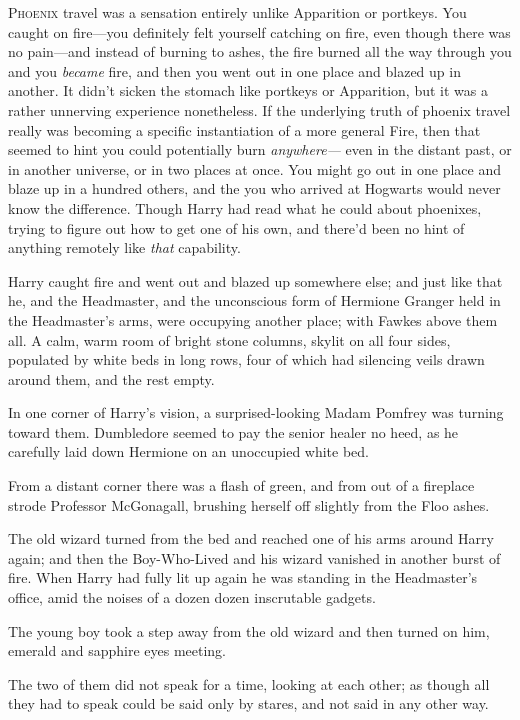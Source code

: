 
\lettrine{P}{hoenix} travel
was a sensation entirely unlike Apparition or portkeys. You caught on
fire---you definitely felt yourself catching on fire, even though there was no
pain---and instead of burning to ashes, the fire burned all the way through you
and you \emph{became} fire, and then you went out in one place and blazed up in
another. It didn't sicken the stomach like portkeys or Apparition, but it was a
rather unnerving experience nonetheless. If the underlying truth of phoenix
travel really was becoming a specific instantiation of a more general Fire,
then that seemed to hint you could potentially burn \emph{anywhere---} even in
the distant past, or in another universe, or in two places at once. You might
go out in one place and blaze up in a hundred others, and the you who arrived
at Hogwarts would never know the difference. Though Harry had read what he
could about phoenixes, trying to figure out how to get one of his own, and
there'd been no hint of anything remotely like \emph{that} capability.

Harry caught fire and went out and blazed up somewhere else; and just like that
he, and the Headmaster, and the unconscious form of Hermione Granger held in
the Headmaster's arms, were occupying another place; with Fawkes above them
all. A calm, warm room of bright stone columns, skylit on all four sides,
populated by white beds in long rows, four of which had silencing veils drawn
around them, and the rest empty.

In one corner of Harry's vision, a surprised-looking Madam Pomfrey was turning
toward them. Dumbledore seemed to pay the senior healer no heed, as he
carefully laid down Hermione on an unoccupied white bed.

From a distant corner there was a flash of green, and from out of a fireplace
strode Professor McGonagall, brushing herself off slightly from the Floo ashes.

The old wizard turned from the bed and reached one of his arms around Harry
again; and then the Boy-Who-Lived and his wizard vanished in another burst of
fire.
\later
When Harry had fully lit up again he was standing in the Headmaster's office,
amid the noises of a dozen dozen inscrutable gadgets.

The young boy took a step away from the old wizard and then turned on him,
emerald and sapphire eyes meeting.

The two of them did not speak for a time, looking at each other; as though all
they had to speak could be said only by stares, and not said in any other way.

